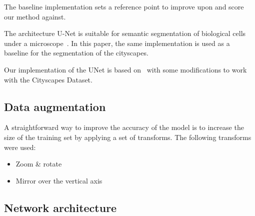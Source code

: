The baseline implementation sets a reference point to improve upon and score our method against.

The architecture U-Net is suitable for semantic segmentation of biological cells under a microscope~\cite{RonnebergerFB15}. 
In this paper, the same implementation is used as a baseline for the segmentation of the cityscapes.

Our implementation of the UNet is based on~\cite{GH-Pytorch-UNet2018} with some modifications to work with the Cityscapes Dataset.

\subsection{Data augmentation}
\label{subsec:data-augmentation}

A straightforward way to improve the accuracy of the model is to increase the size of the training set by applying a set of transforms. The following transforms were used:
\begin{itemize}
    \item Zoom & rotate
    \item Mirror over the vertical axis
\end{itemize}

\subsection{Network architecture}
\label{subsec:network-architecture}


